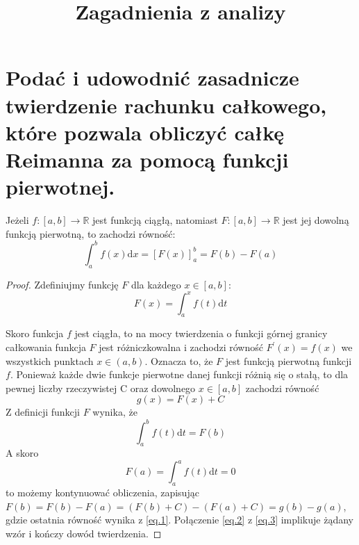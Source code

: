 \documentclass{article}
\title{Zagadnienia z analizy}
\theoremstyle{definition}
\theoremstyle{case}
\begin{document}
\makeatletter
{}
\makeatother

\begin{titlepage}
	\makeatletter
	\begin{center}
		\vspace*{0.3\textheight}
		{\LARGE
			\@title
		\par}
	\end{center}\par
	\vfill
	\tableofcontents
	\vfill
	\makeatother
\end{titlepage}

\newpage

\setcounter{page}{1}

\setcounter{section}{63}

\section{Podać i udowodnić zasadnicze twierdzenie rachunku całkowego,
które pozwala obliczyć całkę Reimanna za pomocą funkcji pierwotnej.}
\indent

Jeżeli ${f \colon [a,b] \to \mathbb{R}}$ jest funkcją ciągłą, natomiast ${F \colon [a,b] \to \mathbb{R}}$
jest jej dowolną funkcją pierwotną, to zachodzi równość:
\begin{equation*}
	\int _a^b f(x) \mathrm d x = [ F(x) ] _a ^b = F(b) - F(a)
\end{equation*}

\begin{proof}
	Zdefiniujmy funkcję $F$ dla każdego ${x \in [a,b]}$:
	\begin{equation*}
		F(x) = \textstyle \int_a^x f(t) \mathrm d t
	\end{equation*}

	Skoro funkcja $f$ jest ciągła, to na mocy twierdzenia o funkcji
	górnej granicy całkowania funkcja $F$ jest różniczkowalna
	i zachodzi równość ${F^\prime(x)=f(x)}$ we wszystkich punktach ${x \in (a,b)}$.
	Oznacza to, że $F$ jest funkcją pierwotną funkcji $f$.
	Ponieważ każde dwie funkcje pierwotne danej funkcji różnią się o stałą,
	to dla pewnej liczby rzeczywistej C oraz dowolnego ${x \in [a,b]}$
	zachodzi równość
	\begin{equation}
		\label{eq.1}
		g(x)=F(x)+C
	\end{equation}
	Z definicji funkcji $F$ wynika, że
	\begin{equation}
		\label{eq.2}
		\textstyle \int_a^b f(t) \mathrm d t = F(b)
	\end{equation}
	A skoro
	\begin{equation}
		\label{eq.3}
		F(a) = \textstyle \int_a^a f(t) \mathrm d t=0
	\end{equation}
	to możemy kontynuować obliczenia, zapisując
	${F(b)=F(b)-F(a)=(F(b)+C)-(F(a)+C)=g(b)-g(a)}$,
	gdzie ostatnia równość wynika z \eqref{eq.1}. Połączenie \eqref{eq.2} z \eqref{eq.3} implikuje żądany wzór i kończy dowód twierdzenia.
\end{proof}
\end{document}
